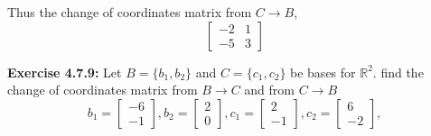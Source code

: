 \documentclass{amsart}
\def\RR{{\mathbb R}}
\begin{document}
Thus the change of coordinates matrix from $C \to B$,
\begin{equation*}
 \begin{bmatrix}
 -2&1\\
 -5&3
 \end{bmatrix}
\end{equation*}
\vspace{1in}




\noindent\textbf{Exercise 4.7.9: }Let $B = \{b_1,b_2\}$ and $C = \{c_1,c_2\}$ be bases for $\RR^2$. find the change of coordinates matrix from $B \to C$ and from $C \to B$
\begin{equation*}
b_1 =
\begin{bmatrix}
-6\\
-1
\end{bmatrix},
b_2 =
\begin{bmatrix}
2\\
0
\end{bmatrix},
c_1 =
\begin{bmatrix}
2\\
-1
\end{bmatrix},
c_2 =
\begin{bmatrix}
6\\
-2
\end{bmatrix},
\end{equation*}
\end{document}
